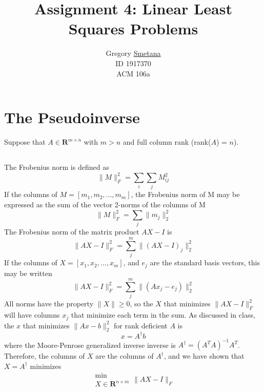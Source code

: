 \documentclass[11pt]{article} %
\title{Assignment 4: Linear Least Squares Problems}
\author{ Gregory \uline{Smetana} \\ID 1917370 \\ ACM 106a }
\begin{document}
\maketitle


\section{The Pseudoinverse}
Suppose that $A \in \mathbf{R}^{m\times n}$ with $m > n$ and full column rank (rank($A$) = $n$). %

\subsection{} %
The Frobenius norm is defined as
\begin{equation}
\| M \|_F^2 = \sum_i \sum_j M_{ij}^2
\end{equation}
If the columns of $M = \left [ m_1, m_2, ... , m_m \right ]$, the Frobenius norm of M may be expressed as the sum of the vector 2-norms of the columns of M
\begin{equation}
\|M \|_F^2 = \sum_j \|m_j \|_2^2
\end{equation}
The Frobenius norm of the matrix product $AX-I$ is
\begin{equation}
\|AX-I\|_F^2 = \sum_j^m \| (AX-I)_j \|_2^2
\end{equation}
If the columns of $X = \left [x_1, x_2, ... , x_m \right ]$, and $e_j$ are the standard basis vectors, this may be written
\begin{equation}
\|AX-I\|_F^2 = \sum_j^m \| (Ax_j-e_j) \|_2^2
\end{equation}
All norms have the property $\| X \| \ge 0$, so the $X$ that minimizes $\|AX-I\|_F^2$ will have columns $x_j$ that minimize each term in the sum. As discussed in class, the $x$ that minimizes $\| Ax -b \|_2^2$ for rank deficient $A$ is 
\begin{equation}
x = A^\dagger b
\end{equation}
where the Moore-Penrose generalized inverse inverse is $A^\dagger = (A^{T}A)^{-1}A^T$. Therefore, the columns of $X$ are the columns of $A^\dagger$, and we have shown that $X=A^\dagger$ minimizes
\begin{equation}
\substack{\min \\X \in \mathbf{R}^{n \times m}} \| AX -I \|_{F}
\end{equation}
\end{document}
